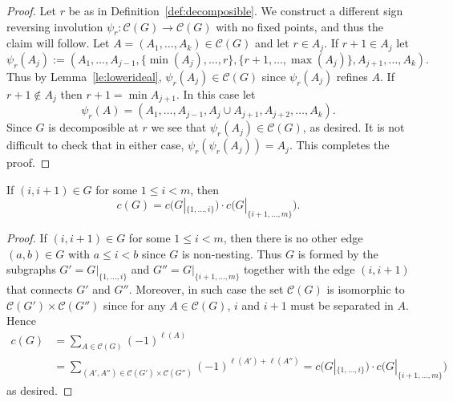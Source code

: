 \begin{proof}
Let $r$ be as in Definition~\ref{def:decomposible}. We construct a different sign reversing involution $\psi_r\colon \mathcal{C}(G)\to \mathcal{C}(G)$ with no fixed points, and thus the claim will follow. Let $A=(A_1,\ldots,A_k)\in \mathcal{C}(G)$ and let $r\in A_j$. If $r+1\in A_j$ let 
$$
\psi_r(A_j) :=(A_1,\ldots,A_{j-1},\{\min(A_j),\ldots,r\},\{r+1,\ldots,\max(A_j)\},A_{j+1},\ldots,A_k) .
$$
Thus by Lemma~\ref{le:lowerideal}, $\psi_r(A_j) \in \mathcal{C}(G)$ since $\psi_r(A_j)$ refines $A$. If $r+1\notin A_j$ then $r+1=\min A_{j+1}$. In this case let
$$\psi_r(A)=(A_1,\ldots,A_{j-1},A_j\cup A_{j+1},A_{j+2},\ldots,A_k).$$ Since $G$ is decomposible at $r$ we see that $\psi_r(A_j) \in \mathcal{C}(G) $, as desired. It is not difficult to check that in either case, $\psi_r(\psi_r(A_j))= A_j$. This completes the proof.
% 
\end{proof}

\begin{lemma}\label{le:shortedge}
 If $(i,i+1)\in G$ for some $1\le i<m$, then 
 $$ c(G)= c\big(G|_{\{1,\ldots, i\}}\big)\cdot c\big(G|_{\{i+1,\ldots, m\}}\big) .$$
\end{lemma}
\begin{proof} If $(i,i+1)\in G$ for some $1\le i<m$, then there is no other edge $(a,b)\in G$ with $a\le i<b$ since $G$ is non-nesting. Thus $G$ is formed by the subgraphs $G' = G|_{\{1,\ldots, i\}}$ and $G''=G|_{\{i+1,\ldots, m\}}$ together with the edge $(i,i+1)$ that connects $G'$ and $G''$. Moreover, in such case the set $\mathcal{C}(G)$ is isomorphic to $\mathcal{C}(G')\times \mathcal{C}(G'')$ since for any $A\in\mathcal{C}(G)$, $i$ and $i+1$ must be separated in $A$.
%
Hence
$$ 
\begin{aligned}
c(G) &= \sum_{A\in \mathcal{C}(G)} (-1)^{\ell(A)} 
\\
&= \sum_{(A',A'')\in \mathcal{C}(G')\times \mathcal{C}(G'')} (-1)^{\ell(A')+\ell(A'')}= c\big(G|_{\{1,\ldots, i\}}\big)\cdot c\big(G|_{\{i+1,\ldots, m\}}\big) 
\end{aligned}
$$
as desired. \end{proof}

